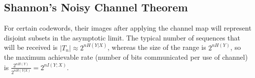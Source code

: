 \documentclass{article}
\begin{document}
\subsection{Shannon's Noisy Channel Theorem}
For certain codewords, their images after applying the channel map will represent disjoint subsets in the asymptotic limit. The typical number of sequences that will be received is $|T_n| \approx 2^{nH(Y|X)}$, whereas the size of the range is  $2^{nH(Y)}$, so the maximum achievable rate (number of bits communicated per use of channel) is $\frac{2^{nH(Y)}}{2^{nH(Y|X)}} = 2^{nI(Y;X)}$.\\
\end{document}
